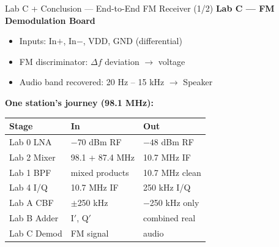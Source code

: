 \documentclass[aspectratio=169]{beamer}
\begin{document}
\begin{frame}{Lab C + Conclusion --- End-to-End FM Receiver (1/2)}
\textbf{Lab C --- FM Demodulation Board}
\begin{itemize}
  \item Inputs: In$+$, In$-$, VDD, GND (differential)
  \item FM discriminator: $\Delta f$ deviation $\to$ voltage
  \item Audio band recovered: 20 Hz -- 15 kHz $\to$ Speaker
\end{itemize}

\vspace{0.3cm}
\textbf{One station's journey (98.1 MHz):}

\vspace{0.1cm}
\small
\begin{tabular}{@{}lll@{}}
\toprule
Stage & In & Out \\
\midrule
Lab 0 LNA   & $-70$ dBm RF    & $-48$ dBm RF \\
Lab 2 Mixer & 98.1 + 87.4 MHz & 10.7 MHz IF \\
Lab 1 BPF   & mixed products  & 10.7 MHz clean \\
Lab 4 I/Q   & 10.7 MHz IF     & 250 kHz I/Q \\
Lab A CBF   & $\pm$250 kHz    & $-$250 kHz only \\
Lab B Adder & I$'$, Q$'$      & combined real \\
Lab C Demod & FM signal       & audio \\
\bottomrule
\end{tabular}
\end{frame}
\end{document}
